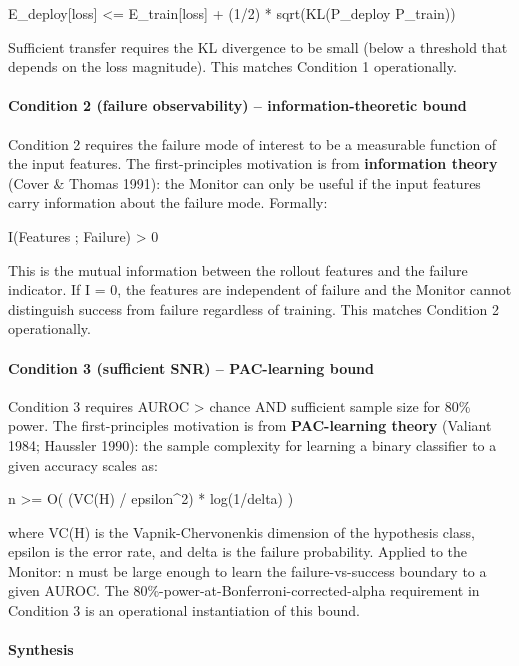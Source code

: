 \documentclass[
]{article}
\begin{document}
E\_deploy{[}loss{]} \textless= E\_train{[}loss{]} + (1/2) *
sqrt(KL(P\_deploy \textbar\textbar{} P\_train))

Sufficient transfer requires the KL divergence to be small (below a
threshold that depends on the loss magnitude). This matches Condition 1
operationally.

\paragraph{Condition 2 (failure observability) -- information-theoretic
bound}\label{condition-2-failure-observability-information-theoretic-bound}

Condition 2 requires the failure mode of interest to be a measurable
function of the input features. The first-principles motivation is from
\textbf{information theory} (Cover \& Thomas 1991): the Monitor can only
be useful if the input features carry information about the failure
mode. Formally:

I(Features ; Failure) \textgreater{} 0

This is the mutual information between the rollout features and the
failure indicator. If I = 0, the features are independent of failure and
the Monitor cannot distinguish success from failure regardless of
training. This matches Condition 2 operationally.

\paragraph{Condition 3 (sufficient SNR) -- PAC-learning
bound}\label{condition-3-sufficient-snr-pac-learning-bound}

Condition 3 requires AUROC \textgreater{} chance AND sufficient sample
size for 80\% power. The first-principles motivation is from
\textbf{PAC-learning theory} (Valiant 1984; Haussler 1990): the sample
complexity for learning a binary classifier to a given accuracy scales
as:

n \textgreater= O( (VC(H) / epsilon\^{}2) * log(1/delta) )

where VC(H) is the Vapnik-Chervonenkis dimension of the hypothesis
class, epsilon is the error rate, and delta is the failure probability.
Applied to the Monitor: n must be large enough to learn the
failure-vs-success boundary to a given AUROC. The
80\%-power-at-Bonferroni-corrected-alpha requirement in Condition 3 is
an operational instantiation of this bound.

\paragraph{Synthesis}\label{synthesis}
\end{document}
